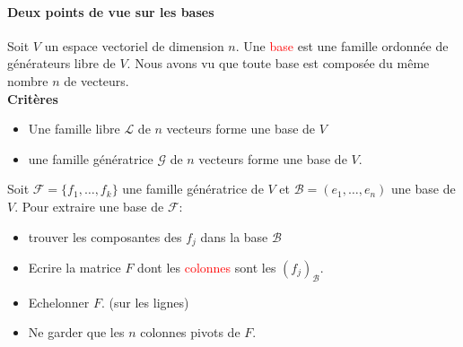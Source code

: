 \paragraph{Deux points de vue sur les bases}
Soit $V$ un espace vectoriel de dimension $n$. Une \textcolor{red}{base} est une famille ordonnée de générateurs libre de $V$. Nous avons vu que toute base est composée du même nombre $n$ de vecteurs.
\\
\textbf{Critères}
\begin{itemize}
    \item Une famille libre $\mathcal{L}$ de $n$ vecteurs forme une base de $V$
    \item une famille génératrice $\mathcal{G}$ de $n$ vecteurs forme une base de $V$.
\end{itemize}
Soit $\mathcal{F}  = \{f_1, \dots, f_k\}$ une famille génératrice de $V$ et $\mathcal{B} = (e_1, \dots, e_n)$ une base de $V$. Pour extraire une base de $\mathcal{F}:$
\begin{itemize}
    \item trouver les composantes des $f_j$ dans la base $\mathcal{B}$
    \item Ecrire la matrice $F$ dont les \textcolor{red}{colonnes} sont les $(f_j)_{\mathcal{B}}$.
    \item Echelonner $F$. (sur les lignes)
    \item Ne garder que les $n$ colonnes pivots de $F$.
    
\end{itemize}

